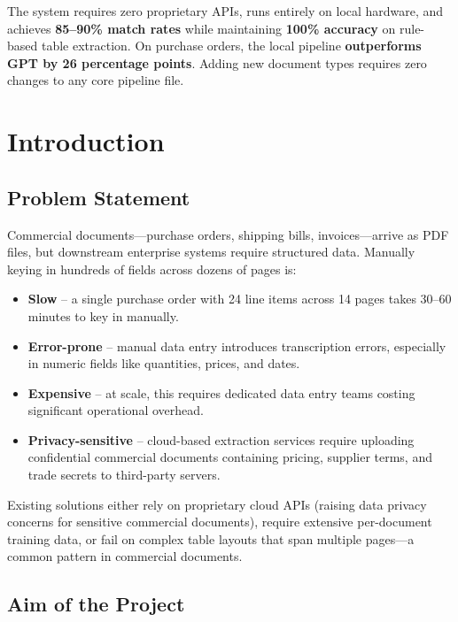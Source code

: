 \documentclass[12pt,a4paper]{report}
\begin{document}
The system requires zero proprietary APIs, runs entirely on local hardware, and achieves \textbf{85--90\% match rates} while maintaining \textbf{100\% accuracy} on rule-based table extraction. On purchase orders, the local pipeline \textbf{outperforms GPT by 26 percentage points}. Adding new document types requires zero changes to any core pipeline file.

\chapter{Introduction}

\section{Problem Statement}

Commercial documents---purchase orders, shipping bills, invoices---arrive as PDF files, but downstream enterprise systems require structured data. Manually keying in hundreds of fields across dozens of pages is:

\begin{itemize}[nosep]
    \item \textbf{Slow} -- a single purchase order with 24 line items across 14 pages takes 30--60 minutes to key in manually.
    \item \textbf{Error-prone} -- manual data entry introduces transcription errors, especially in numeric fields like quantities, prices, and dates.
    \item \textbf{Expensive} -- at scale, this requires dedicated data entry teams costing significant operational overhead.
    \item \textbf{Privacy-sensitive} -- cloud-based extraction services require uploading confidential commercial documents containing pricing, supplier terms, and trade secrets to third-party servers.
\end{itemize}

Existing solutions either rely on proprietary cloud APIs (raising data privacy concerns for sensitive commercial documents), require extensive per-document training data, or fail on complex table layouts that span multiple pages---a common pattern in commercial documents.

\section{Aim of the Project}
\end{document}
